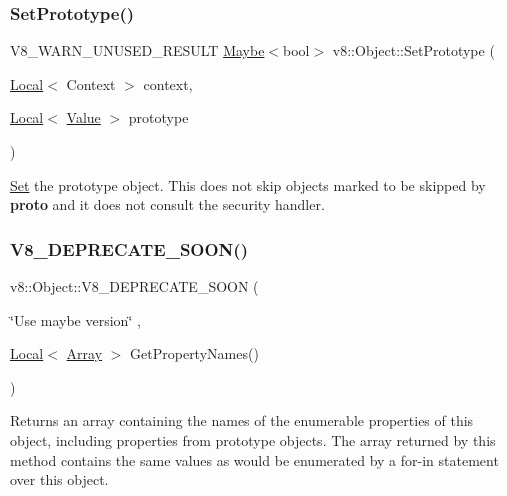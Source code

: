 \subsubsection{\texorpdfstring{Set\+Prototype()}{SetPrototype()}}
{\footnotesize\ttfamily V8\+\_\+\+W\+A\+R\+N\+\_\+\+U\+N\+U\+S\+E\+D\+\_\+\+R\+E\+S\+U\+LT \mbox{\hyperlink{classv8_1_1Maybe}{Maybe}}$<$bool$>$ v8\+::\+Object\+::\+Set\+Prototype (\begin{DoxyParamCaption}\item[{\mbox{\hyperlink{classv8_1_1Local}{Local}}$<$ Context $>$}]{context,  }\item[{\mbox{\hyperlink{classv8_1_1Local}{Local}}$<$ \mbox{\hyperlink{classv8_1_1Value}{Value}} $>$}]{prototype }\end{DoxyParamCaption})}

\mbox{\hyperlink{classv8_1_1Set}{Set}} the prototype object. This does not skip objects marked to be skipped by {\bfseries proto} and it does not consult the security handler. \mbox{\label{classv8_1_1Object_a3f735ad2eab826ddc5eba467ce624acb}} 
\subsubsection{\texorpdfstring{V8\+\_\+\+D\+E\+P\+R\+E\+C\+A\+T\+E\+\_\+\+S\+O\+O\+N()}{V8\_DEPRECATE\_SOON()}\hspace{0.1cm}{\footnotesize\ttfamily [1/2]}}
{\footnotesize\ttfamily v8\+::\+Object\+::\+V8\+\_\+\+D\+E\+P\+R\+E\+C\+A\+T\+E\+\_\+\+S\+O\+ON (\begin{DoxyParamCaption}\item[{\char`\"{}Use maybe version\char`\"{}}]{,  }\item[{\mbox{\hyperlink{classv8_1_1Local}{Local}}$<$ \mbox{\hyperlink{classv8_1_1Array}{Array}} $>$ }]{Get\+Property\+Names() }\end{DoxyParamCaption})}

Returns an array containing the names of the enumerable properties of this object, including properties from prototype objects. The array returned by this method contains the same values as would be enumerated by a for-\/in statement over this object. \mbox{\label{classv8_1_1Object_aa72e9d0d22d1d4a4c4b63827a5469d40}} 
